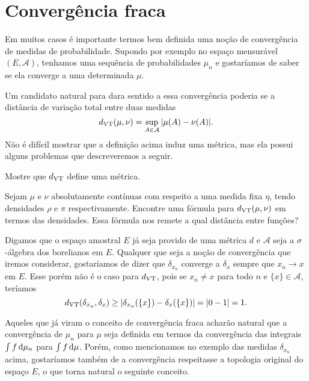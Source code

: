 \section{Convergência fraca}

Em muitos casos é importante termos bem definida uma noção de convergência de medidas de probabilidade.
Supondo por exemplo no espaço mensurável $(E,\mathcal{A})$, tenhamos uma sequência de probabilidades $\mu_n$ e gostaríamos de saber se ela converge a uma determinada $\mu$.

Um candidato natural para dara sentido a essa convergência poderia se a distância de variação total entre duas medidas
\begin{equation}
  d_{\operatorname{VT}}(\mu,\nu) = \sup_{A \in \mathcal{A}} |\mu(A) - \nu(A)|.
\end{equation}
Não é difícil mostrar que a definição acima induz uma métrica, mas ela possui alguns problemas que descreveremos a seguir.

\begin{exercise}
  Mostre que $d_{\operatorname{VT}}$ define uma métrica.
\end{exercise}

\begin{exercise}
  Sejam $\mu$ e $\nu$ absolutamente contínuas com respeito a uma medida fixa $\eta$, tendo densidades $\rho$ e $\pi$ respectivamente.
  Encontre uma fórmula para $d_{\operatorname{VT}}(\mu, \nu)$ em termos das densidades.
  Essa fórmula nos remete a qual distância entre funções?
\end{exercise}

Digamos que o espaço amostral $E$ já seja provido de uma métrica $d$ e $\mathcal{A}$ seja a $\sigma$-álgebra dos borelianos em $E$.
Qualquer que seja a noção de convergência que iremos considerar, gostaríamos de dizer que $\delta_{x_n}$ converge a $\delta_x$ sempre que $x_n \to x$ em $E$.
Esse porém não é o caso para $d_{\operatorname{VT}}$, pois se $x_n \neq x$ para todo $n$ e $\{x\} \in \mathcal{A}$, teríamos
\begin{equation}
  d_{\operatorname{VT}}(\delta_{x_n}, \delta_x) \geq |\delta_{x_n}(\{x\}) - \delta_{x}(\{x\}) | = |0 - 1| = 1.
\end{equation}

Aqueles que já viram o conceito de convergência fraca acharão natural que a convergência de $\mu_n$ para $\mu$ seja definida em termos da convergência das integrais $\int f \mathop{}\!\mathrm{d} \mu_n$ para $\int f \mathop{}\!\mathrm{d} \mu$.
Porém, como mencionamos no exemplo das medidas $\delta_{x_n}$ acima, gostaríamos também de a convergência respeitasse a topologia original do espaço $E$, o que torna natural o seguinte conceito.

